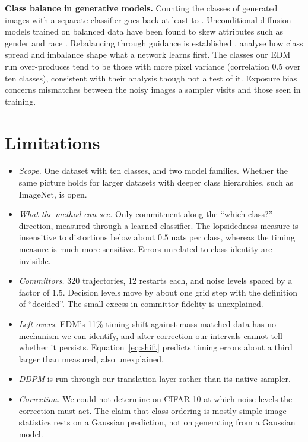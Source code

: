 \documentclass[11pt]{article}
\newcommand{\para}[1]{\textbf{#1}\hspace{0.6em}}
\begin{document}
\para{Class balance in generative models.}
Counting the classes of generated images with a separate classifier goes back at least to \citet{santurkar2018classification}. Unconditional diffusion models trained on balanced data have been found to skew attributes such as gender and race \citep{perera2023analyzing,pal2023gaussian}. Rebalancing through guidance is established \citep{qin2023class,parihar2024balancing}. \citet{nicoletti2026interplay} analyse how class spread and imbalance shape what a network learns first. The classes our EDM run over-produces tend to be those with more pixel variance (correlation $0.5$ over ten classes), consistent with their analysis though not a test of it. Exposure bias \citep{ning2024elucidating} concerns mismatches between the noisy images a sampler visits and those seen in training.

\section{Limitations}

\begin{itemize}[leftmargin=*]
\item \emph{Scope.} One dataset with ten classes, and two model families. Whether the same picture holds for larger datasets with deeper class hierarchies, such as ImageNet, is open.
\item \emph{What the method can see.} Only commitment along the ``which class?'' direction, measured through a learned classifier. The lopsidedness measure is insensitive to distortions below about $0.5$ nats per class, whereas the timing measure is much more sensitive. Errors unrelated to class identity are invisible.
\item \emph{Committors.} 320 trajectories, 12 restarts each, and noise levels spaced by a factor of $1.5$. Decision levels move by about one grid step with the definition of ``decided''. The small excess in committor fidelity is unexplained.
\item \emph{Left-overs.} EDM's 11\% timing shift against mass-matched data has no mechanism we can identify, and after correction our intervals cannot tell whether it persists. Equation~\eqref{eq:shift} predicts timing errors about a third larger than measured, also unexplained.
\item \emph{DDPM} is run through our translation layer rather than its native sampler.
\item \emph{Correction.} We could not determine on CIFAR-10 at which noise levels the correction must act. The claim that class ordering is mostly simple image statistics rests on a Gaussian prediction, not on generating from a Gaussian model.
\end{itemize}
\end{document}
